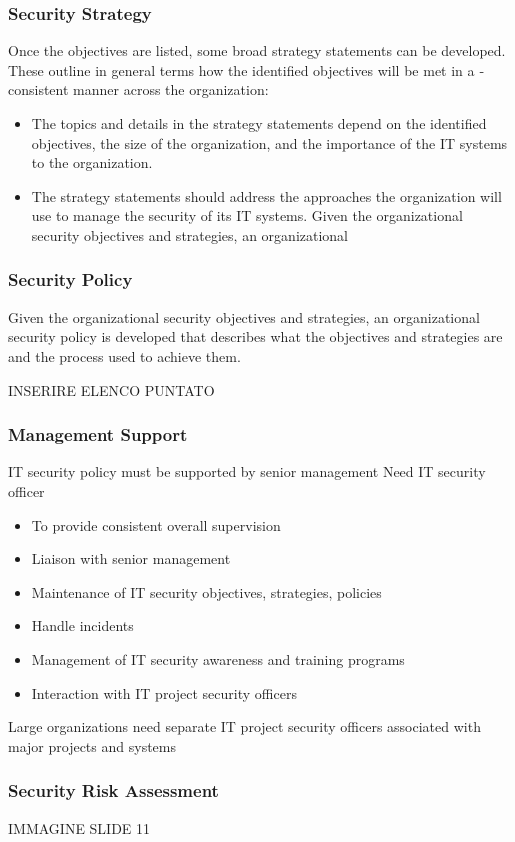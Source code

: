 \documentclass[xcolor ={table,usenames,dvipsnames}]{beamer}
\theoremstyle{definition}
\begin{document}
	\begin{frame}
		\frametitle{Security Strategy}
		Once the objectives are listed, some broad strategy statements can be developed.
		These outline in general terms how the identified objectives will be met in a ­consistent manner across the organization:
		\begin{itemize}
			 \item The topics and details in the strategy ­statements
			depend on the identified objectives, the size of the organization, and the importance of the IT systems to the organization. 
			\item The strategy statements should address the approaches the organization will use to manage the security of its IT systems. Given the organizational security objectives and strategies, an organizational
		\end{itemize}	
	\end{frame}

	\begin{frame}
		\frametitle{Security Policy}
		Given the organizational security objectives and strategies, an organizational
		security policy is developed that describes what the objectives and strategies are and the process used to achieve them. 
		
		INSERIRE ELENCO PUNTATO
	\end{frame}

	\begin{frame}
		\frametitle{Management Support }
		IT security policy must be supported by senior management
		Need IT security officer
		\begin{itemize}
			\item To provide consistent overall supervision
			\item Liaison with senior management
			\item Maintenance of IT security objectives, strategies, policies
			\item Handle incidents
			\item Management of IT security awareness and training programs
			\item Interaction with IT project security officers
		\end{itemize}
		Large organizations need separate IT project security officers associated with major projects and systems
	\end{frame}

	\begin{frame}
		\frametitle{Security Risk Assessment}
		IMMAGINE SLIDE 11
	\end{frame}
\end{document}
